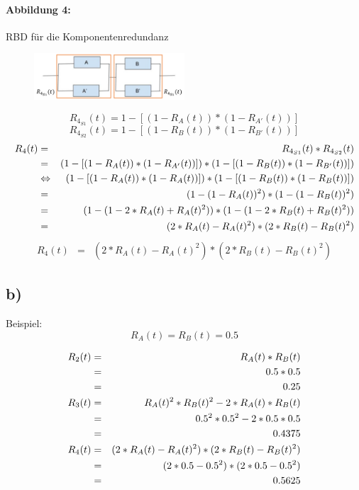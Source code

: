	\newpage
	\paragraph{Abbildung 4:}
		RBD für die Komponentenredundanz
		\begin{figure}[h]
			\centering
			\includegraphics[width=0.5\textwidth]{../2/abbildung_4.png}
		\end{figure}
		\begin{equation*}
			R_{4_{S1}}(t) = 1 - [ (1 - R_A(t)) * (1 - R_{A'}(t)) ]
		\end{equation*}
		\begin{equation*}
			R_{4_{S2}}(t) = 1 - [ (1 - R_B(t)) * (1 - R_{B'}(t)) ]
		\end{equation*}
		\begin{eqnarray*}
			R_4(t) &=&				R_{4_{S1}}(t) * R_{4_{S2}}(t)
			\cr &=&					(1 - [ (1 - R_A(t)) * (1 - R_{A'}(t)) ]) * (1 - [ (1 - R_B(t)) * (1 - R_{B'}(t)) ])
			\cr &\Leftrightarrow&	(1 - [ (1 - R_A(t)) * (1 - R_A(t)) ]) * (1 - [ (1 - R_B(t)) * (1 - R_B(t)) ])
			\cr &=&					(1 - (1 - R_A(t))^2) * (1 - (1 - R_B(t))^2)
			\cr &=&					(1 - (1 - 2*R_A(t) + R_A(t)^2)) * (1 - (1 - 2*R_B(t) + R_B(t)^2))
			\cr &=&					(2*R_A(t) - R_A(t)^2) * (2*R_B(t) - R_B(t)^2)
		\end{eqnarray*}
		\begin{eqnarray*}
			R_4(t) &=& (2*R_A(t) - R_A(t)^2) * (2*R_B(t) - R_B(t)^2)
		\end{eqnarray*}


\subsection*{b)}

	Beispiel:
	\begin{equation*}
		R_A(t) = R_B(t) = 0.5
	\end{equation*}

	\begin{eqnarray*}
		R_2(t)		&=& R_A(t) * R_B(t)
		\cr			&=& 0.5 * 0.5
		\cr			&=& 0.25
		\cr R_3(t)	&=& R_A(t)^2 * R_B(t)^2 - 2*R_A(t)*R_B(t)
		\cr			&=& 0.5^2 * 0.5^2 - 2*0.5*0.5
		\cr			&=& 0.4375
		\cr R_4(t)	&=& (2*R_A(t) - R_A(t)^2) * (2*R_B(t) - R_B(t)^2)
		\cr			&=& (2*0.5 - 0.5^2) * (2*0.5 - 0.5^2)
		\cr			&=& 0.5625
	\end{eqnarray*}
	